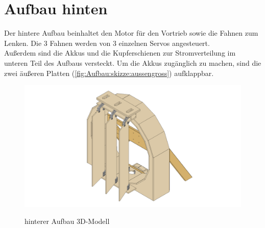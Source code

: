 \clearpage
\section{Aufbau hinten}
Der hintere Aufbau beinhaltet den Motor für den Vortrieb sowie die Fahnen zum Lenken. Die 3 Fahnen werden von 3 einzelnen Servos angesteuert.\\ Außerdem sind die Akkus und die Kupferschienen zur Stromverteilung im unteren Teil des Aufbaus versteckt. Um die Akkus zugänglich zu machen, sind die zwei äußeren Platten (\autoref{fig:Aufbau:skizze:aussengross}) aufklappbar.

\begin{figure}[H]
    \centering
    \includegraphics[width=1.1\textwidth]{../Inventor/hintererAufbau/png/hintererAufbau_hauptansicht.png}
    \label{fig:aufbau:haupt}
    \caption{hinterer Aufbau 3D-Modell}
\end{figure}

